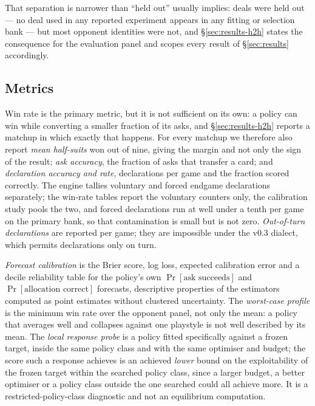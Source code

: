 That separation is narrower than ``held out'' usually implies: deals were held
out --- no deal used in any reported experiment appears in any fitting or
selection bank --- but most opponent identities were not, and
\S\ref{sec:results-h2h} states the consequence for the evaluation panel and
scopes every result of \S\ref{sec:results} accordingly.

\subsection{Metrics}
\label{sec:protocol-metrics}

Win rate is the primary metric, but it is not sufficient on its own: a policy
can win while converting a smaller fraction of its asks, and
\S\ref{sec:results-h2h} reports a matchup in which exactly that happens. For
every matchup we therefore also report \emph{mean half-suits} won out of nine,
giving the margin and not only the sign of the result; \emph{ask accuracy},
the fraction of asks that transfer a card; and \emph{declaration accuracy and
rate}, declarations per game and the fraction scored correctly. The engine
tallies voluntary and forced endgame declarations separately; the win-rate
tables report the voluntary counters only, the calibration study pools the
two, and forced declarations run at well under a tenth per game on the primary
bank, so that contamination is small but is not zero. \emph{Out-of-turn
declarations} are reported per game; they are impossible under the v0.3
dialect, which permits declarations only on turn.

\emph{Forecast calibration} is the Brier score, log loss, expected calibration
error and a decile reliability table for the policy's own $\Pr[\text{ask
succeeds}]$ and $\Pr[\text{allocation correct}]$ forecasts, descriptive
properties of the estimators computed as point estimates without clustered
uncertainty. The \emph{worst-case profile} is the minimum win rate over the
opponent panel, not only the mean: a policy that averages well and collapses
against one playstyle is not well described by its mean. The \emph{local
response probe} is a policy fitted specifically against a frozen target,
inside the same policy class and with the same optimiser and budget; the score
such a response achieves is an achieved \emph{lower} bound on the
exploitability of the frozen target within the searched policy class, since a
larger budget, a better optimiser or a policy class outside the one searched
could all achieve more. It is a restricted-policy-class diagnostic and not an
equilibrium computation.
